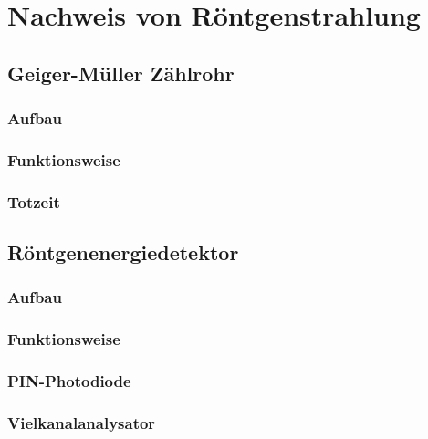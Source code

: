 \section{Nachweis von Röntgenstrahlung}

\subsection{Geiger-Müller Zählrohr}

\parencite[Abschnitt~9.3.2]{meschede-gerthsen_24}

\parencite[Abschnitt~19.3.2~d)]{meschede-gerthsen_24}

\subsubsection{Aufbau}

\subsubsection{Funktionsweise}

\subsubsection{Totzeit}

\subsection{Röntgenenergiedetektor}

\subsubsection{Aufbau}

\subsubsection{Funktionsweise}

\subsubsection{PIN-Photodiode}

\parencite[Abschnitt~„Photodiode“]{wikipedia/pin-Diode}

\subsubsection{Vielkanalanalysator}

